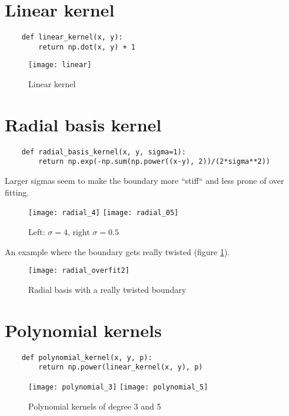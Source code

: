 \documentclass{article}
\begin{document}
\section{Linear kernel}

    \begin{verbatim}
    def linear_kernel(x, y):
        return np.dot(x, y) + 1
    \end{verbatim}

    \begin{figure}[ht]
        \centering
        \texttt{[image: linear]}
        \caption{Linear kernel}
    \end{figure}

\section{Radial basis kernel}

    \begin{verbatim}
    def radial_basis_kernel(x, y, sigma=1):
        return np.exp(-np.sum(np.power((x-y), 2))/(2*sigma**2))
    \end{verbatim}

    Larger sigmas seem to make the boundary more ``stiff`` and less prone of over
    fitting.  
    \begin{figure}[ht]
        \centering
        \texttt{[image: radial\_4]}
        \texttt{[image: radial\_05]}
        \caption{Left: $\sigma = 4$, right $\sigma = 0.5$}
    \end{figure}

    An example where the boundary gets really twisted (figure \ref{fig:radial_overfit}).
    \begin{figure}[ht]
        \centering
        \texttt{[image: radial\_overfit2]}
        \caption{Radial basis with a really twisted boundary}
        \label{fig:radial_overfit}
    \end{figure}

\section{Polynomial kernels}

    \begin{verbatim}
    def polynomial_kernel(x, y, p):
        return np.power(linear_kernel(x, y), p)
    \end{verbatim}

    \begin{figure}[ht]
        \centering
        \texttt{[image: polynomial\_3]}
        \texttt{[image: polynomial\_5]}
        \caption{Polynomial kernels of degree 3 and 5}
    \end{figure}
\end{document}
